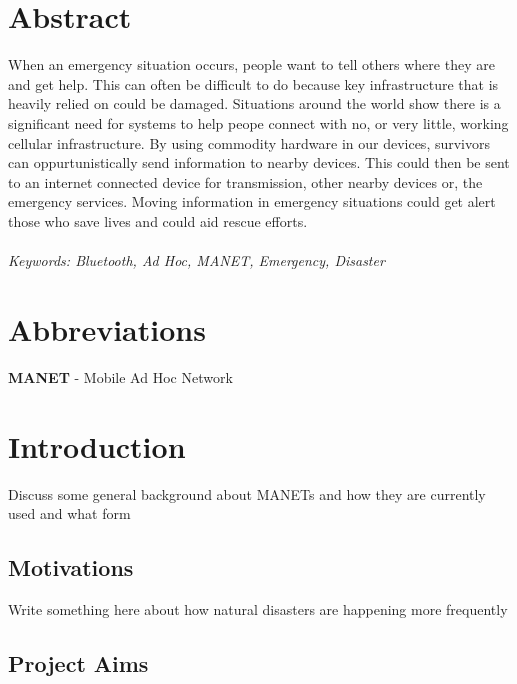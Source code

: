 \documentclass{report}
\begin{document}
\chapter*{Abstract}

When an emergency situation occurs, people want to tell others where they are and get help. 
This can often be difficult to do because key infrastructure that is heavily relied on could be damaged.
Situations around the world show there is a significant need for systems to help peope connect with no, or very little, working cellular infrastructure. 
By using commodity hardware in our devices, survivors can oppurtunistically send information to nearby devices. 
This could then be sent to an internet connected device for transmission, other nearby devices or, the emergency services. 
Moving information in emergency situations could get alert those who save lives and could aid rescue efforts.
\\
\\
\textit{Keywords: Bluetooth, Ad Hoc, MANET, Emergency, Disaster}



\chapter*{Abbreviations}

\textbf{MANET} - Mobile Ad Hoc Network


\tableofcontents{}

\chapter{Introduction}

Discuss some general background about MANETs and how they are currently used and what form

\section{Motivations}
Write something here about how natural disasters are happening more frequently

\section{Project Aims}
\end{document}

